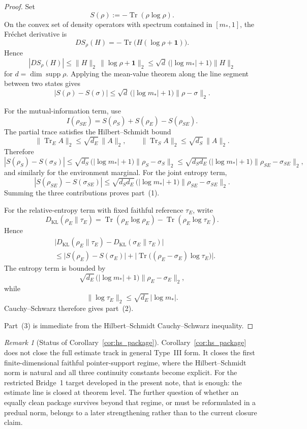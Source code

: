 \documentclass[12pt]{article}
\theoremstyle{definition}
\theoremstyle{remark}
\newtheorem{remark}[theorem]{Remark}
\begin{document}
\begin{proof}
Set
\[
S(\rho):=-\operatorname{Tr}(\rho\log\rho).
\]
On the convex set of density operators with spectrum contained in
\([m_*,1]\), the Fr\'echet derivative is
\[
DS_\rho(H)=-\operatorname{Tr}\bigl(H(\log\rho+\mathbf 1)\bigr).
\]
Hence
\[
|DS_\rho(H)|
\le
\|H\|_2\,\|\log\rho+\mathbf 1\|_2
\le
\sqrt{d}\,\bigl(|\log m_*|+1\bigr)\|H\|_2
\]
for \(d=\dim\operatorname{supp}\rho\). Applying the mean-value theorem
along the line segment between two states gives
\[
|S(\rho)-S(\sigma)|
\le
\sqrt{d}\,\bigl(|\log m_*|+1\bigr)\|\rho-\sigma\|_2.
\]

For the mutual-information term, use
\[
I(\rho_{SE})=S(\rho_S)+S(\rho_E)-S(\rho_{SE}).
\]
The partial trace satisfies the Hilbert--Schmidt bound
\[
\|\operatorname{Tr}_E A\|_2\le \sqrt{d_E}\,\|A\|_2,
\qquad
\|\operatorname{Tr}_S A\|_2\le \sqrt{d_S}\,\|A\|_2.
\]
Therefore
\[
|S(\rho_S)-S(\sigma_S)|
\le
\sqrt{d_S}\,\bigl(|\log m_*|+1\bigr)\|\rho_S-\sigma_S\|_2
\le
\sqrt{d_Sd_E}\,\bigl(|\log m_*|+1\bigr)\|\rho_{SE}-\sigma_{SE}\|_2,
\]
and similarly for the environment marginal. For the joint entropy term,
\[
|S(\rho_{SE})-S(\sigma_{SE})|
\le
\sqrt{d_Sd_E}\,\bigl(|\log m_*|+1\bigr)\|\rho_{SE}-\sigma_{SE}\|_2.
\]
Summing the three contributions proves part~(1).

For the relative-entropy term with fixed faithful reference \(\tau_E\),
write
\[
D_{\mathrm{KL}}(\rho_E\|\tau_E)
=
\operatorname{Tr}(\rho_E\log\rho_E)-\operatorname{Tr}(\rho_E\log\tau_E).
\]
Hence
\begin{align*}
&\bigl|D_{\mathrm{KL}}(\rho_E\|\tau_E)
-D_{\mathrm{KL}}(\sigma_E\|\tau_E)\bigr| \\
&\le
\bigl|S(\rho_E)-S(\sigma_E)\bigr|
+
\bigl|\operatorname{Tr}\bigl((\rho_E-\sigma_E)\log\tau_E\bigr)\bigr|.
\end{align*}
The entropy term is bounded by
\[
\sqrt{d_E}\,\bigl(|\log m_*|+1\bigr)\|\rho_E-\sigma_E\|_2,
\]
while
\[
\|\log\tau_E\|_2\le \sqrt{d_E}\,|\log m_*|.
\]
Cauchy--Schwarz therefore gives part~(2).

Part~(3) is immediate from the Hilbert--Schmidt Cauchy--Schwarz
inequality.
\end{proof}

\begin{remark}[Status of Corollary~\ref{cor:hs_package}]
Corollary~\ref{cor:hs_package} does not close the full estimate track in
general Type~III form. It closes the first finite-dimensional faithful
pointer-support regime, where the Hilbert--Schmidt norm is natural and
all three continuity constants become explicit. For the restricted
Bridge~1 target developed in the present note, that is enough: the
estimate line is closed at theorem level. The further question of
whether an equally clean package survives beyond that regime, or must be
reformulated in a predual norm, belongs to a later strengthening rather
than to the current closure claim.
\end{remark}
\end{document}

